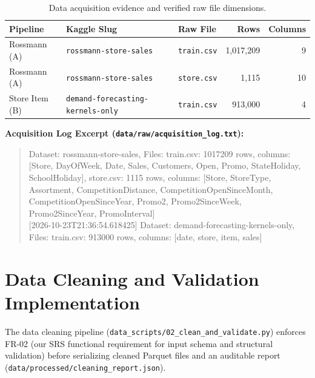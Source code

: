 \documentclass[11pt,a4paper]{article}
\begin{document}
\begin{table}[H]
    \centering
    \small
    \begin{tabular}{lllrr}
        \toprule
        \textbf{Pipeline} & \textbf{Kaggle Slug} & \textbf{Raw File} & \textbf{Rows} & \textbf{Columns} \\
        \midrule
        Rossmann (A) & \texttt{rossmann-store-sales} & \texttt{train.csv} & 1,017,209 & 9 \\
        Rossmann (A) & \texttt{rossmann-store-sales} & \texttt{store.csv} & 1,115 & 10 \\
        Store Item (B) & \texttt{demand-forecasting-kernels-only} & \texttt{train.csv} & 913,000 & 4 \\
        \bottomrule
    \end{tabular}
    \caption{Data acquisition evidence and verified raw file dimensions.}
    \label{tab:raw_schemas}
\end{table}

\noindent\textbf{Acquisition Log Excerpt (\texttt{data/raw/acquisition\_log.txt}):}
\begin{quote}
\small\ttfamily
[2026-10-23T21:36:51.855851] Dataset: rossmann-store-sales, Files: train.csv: 1017209 rows, columns: [Store, DayOfWeek, Date, Sales, Customers, Open, Promo, StateHoliday, SchoolHoliday], store.csv: 1115 rows, columns: [Store, StoreType, Assortment, CompetitionDistance, CompetitionOpenSinceMonth, CompetitionOpenSinceYear, Promo2, Promo2SinceWeek, Promo2SinceYear, PromoInterval]\\
{[2026-10-23T21:36:54.618425]} Dataset: demand-forecasting-kernels-only, Files: train.csv: 913000 rows, columns: [date, store, item, sales]
\end{quote}

\FloatBarrier

\section{Data Cleaning and Validation Implementation}

The data cleaning pipeline (\texttt{data\_scripts/02\_clean\_and\_validate.py}) enforces FR-02 (our SRS functional requirement for input schema and structural validation) before serializing cleaned Parquet files and an auditable report (\texttt{data/processed/cleaning\_report.json}).
\end{document}
